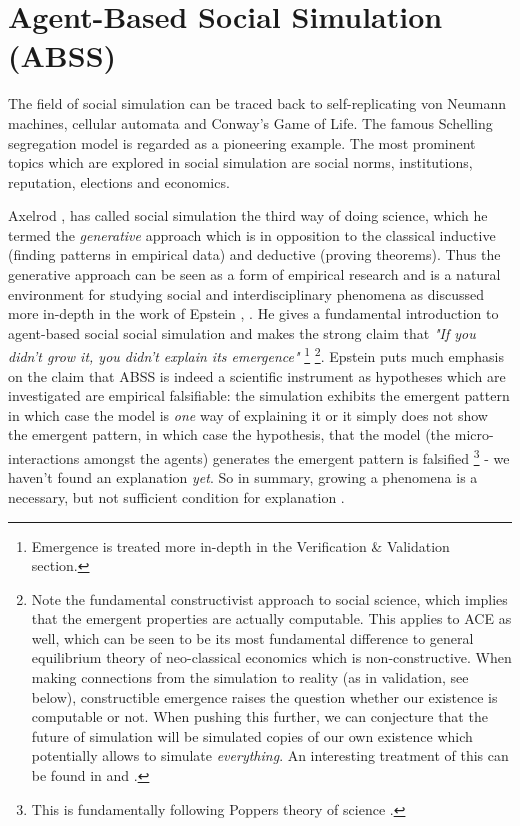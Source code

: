 \section{Agent-Based Social Simulation (ABSS)}
The field of social simulation can be traced back to self-replicating von Neumann machines, cellular automata and Conway's Game of Life. The famous Schelling segregation model \cite{schelling_dynamic_1971} is regarded as a pioneering example. The most prominent topics which are explored in social simulation are social norms, institutions, reputation, elections and economics.

Axelrod \cite{axelrod_advancing_1997}, \cite{axelrod_guide_2006} has called social simulation the third way of doing science, which he termed the \textit{generative} approach which is in opposition to the classical inductive (finding patterns in empirical data) and deductive (proving theorems). Thus the generative approach can be seen as a form of empirical research and is a natural environment for studying social and interdisciplinary phenomena as discussed more in-depth in the work of Epstein \cite{epstein_chapter_2006}, \cite{epstein_generative_2012}. He gives a fundamental introduction to agent-based social social simulation and makes the strong claim that \textit{"If you didn't grow it, you didn't explain its emergence"} \footnote{Emergence is treated more in-depth in the Verification \& Validation section.} \footnote{Note the fundamental constructivist approach to social science, which implies that the emergent properties are actually computable. This applies to ACE as well, which can be seen to be its most fundamental difference to general equilibrium theory of neo-classical economics which is non-constructive. When making connections from the simulation to reality (as in validation, see below), constructible emergence raises the question whether our existence is computable or not. When pushing this further, we can conjecture that the future of simulation will be simulated copies of our own existence which potentially allows to simulate \textit{everything}. An interesting treatment of this can be found in \cite{bostrom_are_2003} and \cite{steinhart_theological_2010}.}. Epstein puts much emphasis on the claim that ABSS is indeed a scientific instrument as hypotheses which are investigated are empirical falsifiable: the simulation exhibits the emergent pattern in which case the model is \textit{one} way of explaining it or it simply does not show the emergent pattern, in which case the hypothesis, that the model (the micro-interactions amongst the agents) generates the emergent pattern is falsified \footnote{This is fundamentally following Poppers theory of science \cite{popper_logic_2002}.} - we haven't found an explanation \textit{yet}. So in summary, growing a phenomena is a necessary, but not sufficient condition for explanation \cite{epstein_chapter_2006}.

